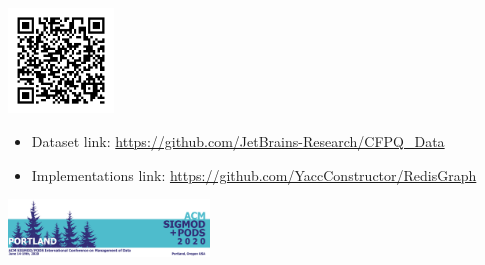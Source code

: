 \documentclass[a0paper,portrait]{baposter}
\begin{document}
\begin{poster}
{\begin{minipage}[t]{0.65\textwidth}
\end{minipage}
~
\begin{minipage}[t]{3cm}
\includegraphics[width=2.8cm]{qr-research-jetbra.pdf}
\vspace{0.7cm}
\end{minipage}
{\scriptsize
\vspace{-1cm}
\begin{itemize}
	\item Dataset link:
	\url{https://github.com/JetBrains-Research/CFPQ_Data}
	\item Implementations link:
	\url{https://github.com/YaccConstructor/RedisGraph}
\end{itemize}
}

}





{\hspace{5pt}\includegraphics[width=0.4\textwidth]{2020Sigmod-LOGO.png}}


\end{poster}
\end{document}
